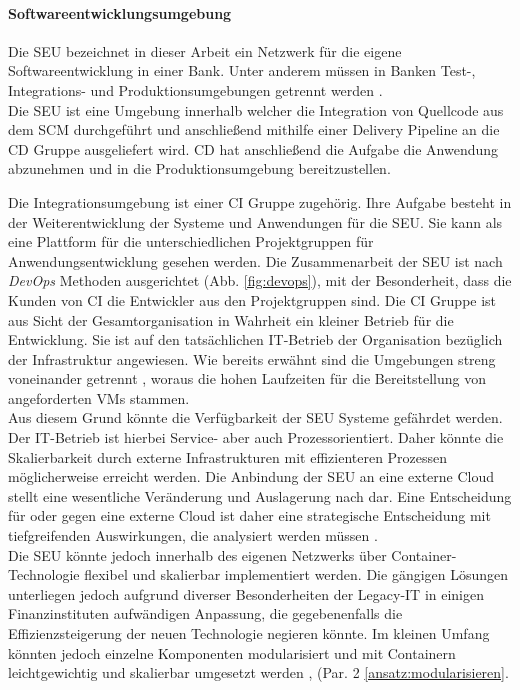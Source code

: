 \paragraph{Softwareentwicklungsumgebung}
Die \ac{SEU} bezeichnet in dieser Arbeit ein Netzwerk für die eigene Softwareentwicklung in einer Bank. Unter anderem müssen in Banken Test-, Integrations- und Produktionsumgebungen getrennt werden \cite{MaRisk:2017}. 
\medskip
\\
Die \ac{SEU} ist eine Umgebung innerhalb welcher die Integration von Quellcode aus dem \ac{SCM} durchgeführt und anschließend mithilfe einer Delivery Pipeline an die \ac{CD} Gruppe ausgeliefert wird. \ac{CD} hat anschließend die Aufgabe die Anwendung abzunehmen und in die Produktionsumgebung bereitzustellen.

Die Integrationsumgebung ist einer \ac{CI} Gruppe zugehörig. Ihre Aufgabe besteht in der Weiterentwicklung der Systeme und Anwendungen für die \ac{SEU}. Sie kann als eine Plattform für die unterschiedlichen Projektgruppen für Anwendungsentwicklung gesehen werden.
Die Zusammenarbeit der \ac{SEU} ist nach \emph{DevOps} Methoden ausgerichtet (Abb. \ref{fig:devops}), mit der Besonderheit, dass die Kunden von \ac{CI} die Entwickler aus den Projektgruppen sind. Die \ac{CI} Gruppe ist aus Sicht der Gesamtorganisation in Wahrheit ein kleiner Betrieb für die Entwicklung. Sie ist auf den tatsächlichen IT-Betrieb der Organisation bezüglich der Infrastruktur angewiesen. Wie bereits erwähnt sind die Umgebungen streng voneinander getrennt \cite{MaRisk:2017}, woraus die hohen Laufzeiten für die Bereitstellung von angeforderten \ac{VMs} stammen. 
\medskip
\\
Aus diesem Grund könnte die Verfügbarkeit der \ac{SEU} Systeme gefährdet werden. Der IT-Betrieb ist hierbei Service- aber auch Prozessorientiert. Daher könnte die Skalierbarkeit durch externe Infrastrukturen mit effizienteren Prozessen möglicherweise erreicht werden. Die Anbindung der \ac{SEU} an eine externe Cloud stellt eine wesentliche Veränderung und Auslagerung nach \cite{MaRisk:2017, BAIT:2018} dar. Eine Entscheidung für oder gegen eine externe Cloud ist daher eine strategische Entscheidung mit tiefgreifenden Auswirkungen, die analysiert werden müssen \cite{recht/Bornemann2018, MaRisk:2017, BAIT:2018}.
\medskip
\\
Die \ac{SEU} könnte jedoch innerhalb des eigenen Netzwerks über Container-Technologie flexibel und skalierbar implementiert werden. Die gängigen Lösungen \cite{Pathania2017, Google:GKEJenkins} unterliegen jedoch aufgrund diverser Besonderheiten der Legacy-IT in einigen Finanzinstituten \cite{Brockhoff2006, Bussmann2006} aufwändigen Anpassung, die gegebenenfalls die Effizienzsteigerung der neuen Technologie negieren könnte. Im kleinen Umfang könnten jedoch einzelne Komponenten modularisiert und mit Containern leichtgewichtig und skalierbar umgesetzt werden \cite{Bussmann2006}, (Par. 2 \ref{ansatz:modularisieren}.


